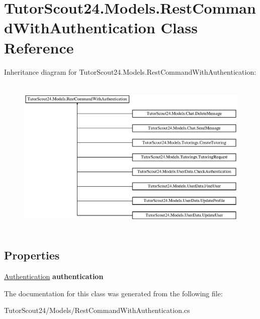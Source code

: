 \hypertarget{class_tutor_scout24_1_1_models_1_1_rest_command_with_authentication}{}\section{Tutor\+Scout24.\+Models.\+Rest\+Command\+With\+Authentication Class Reference}
\label{class_tutor_scout24_1_1_models_1_1_rest_command_with_authentication}
Inheritance diagram for Tutor\+Scout24.\+Models.\+Rest\+Command\+With\+Authentication\+:\begin{figure}[H]
\begin{center}
\leavevmode
\includegraphics[height=7.706422cm]{class_tutor_scout24_1_1_models_1_1_rest_command_with_authentication}
\end{center}
\end{figure}
\subsection*{Properties}
\begin{DoxyCompactItemize}
\item 
\mbox{\label{class_tutor_scout24_1_1_models_1_1_rest_command_with_authentication_a06da5f747a80dd0ea05f1c2bf32d8126}} 
\mbox{\hyperlink{class_tutor_scout24_1_1_models_1_1_user_data_1_1_authentication}{Authentication}} {\bfseries authentication}
\end{DoxyCompactItemize}


The documentation for this class was generated from the following file\+:\begin{DoxyCompactItemize}
\item 
Tutor\+Scout24/\+Models/Rest\+Command\+With\+Authentication.\+cs\end{DoxyCompactItemize}
